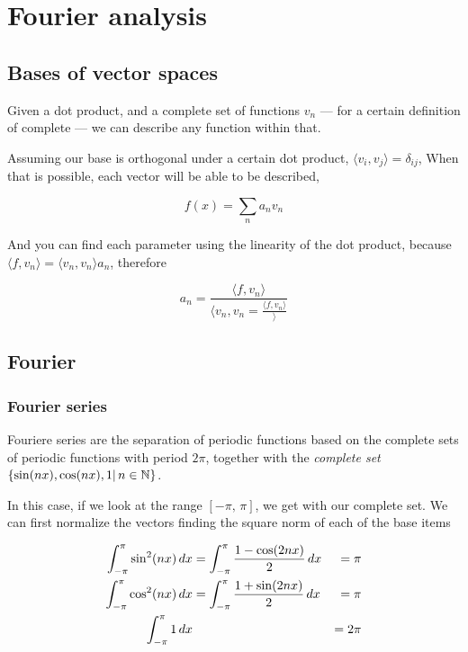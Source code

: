 \documentclass[../main/main.tex]{subfiles}
\begin{document}
\section{Fourier analysis}

\subsection{Bases of vector spaces}

Given a dot product, and a complete set of functions ${v_{n}}$ --- for a certain definition of complete --- we can describe any function within that.

Assuming our base is orthogonal under a certain dot product, $\langle v_{i},v_{j}\!\rangle = \delta_{ij}$, When that is possible, each vector will be able to be described,

\begin{equation}
f(x) = \sum_{n}a_{n} v_{n}
\end{equation}

And you can find each parameter using the linearity of the dot product,  because $\langle f,\! v_{n}\rangle = \langle v_{n},\! v_{n}\rangle a_{n}$, therefore

\begin{equation}
a_{n} = \frac{\langle f,\! v_{n}\rangle}{\langle v_{n},\! v_{n} = \frac{\langle f,\! v_{n}\rangle}\rangle}
\end{equation}




\subsection{Fourier}


\subsubsection{Fourier series}

Fouriere series are the separation of periodic functions based on the complete sets  of periodic functions with period $2\pi$, together with the \emph{complete set} $\left\{\sin (nx), \cos(nx), 1 | \,n \in \mathbb{N}\right\}$.

	In this case, if we look at the range  $[-\pi,\, \pi]$, we get with our complete set. We can first normalize the vectors finding the square norm of each of the base items

	\begin{align}
	\fourierint{\sin^{2}(nx)} &=\fourierint{\frac{1-\cos(2nx)}{2}}  &=\pi  \\
	\fourierint{\cos^{2}(nx)} &=\fourierint{\frac{1+\sin(2nx)}{2}}  &=\pi  \\
	\fourierint{1} &&=2\pi
	\end{align}
\end{document}
